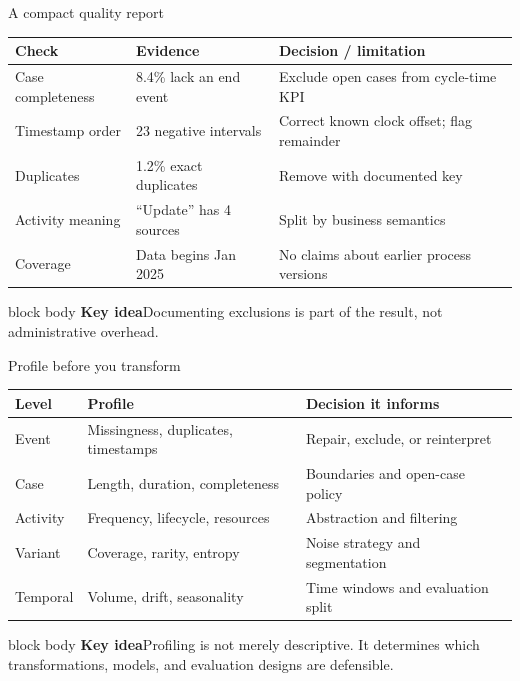 \documentclass[aspectratio=169,11pt]{beamer}
\newcommand{\keyidea}[1]{%
  \begin{beamercolorbox}[rounded=true,sep=0.65em]{block body}
    \textbf{\color{Teal}Key idea}\quad #1
  \end{beamercolorbox}
}
\begin{document}
\begin{frame}{A compact quality report}
  \small
  \begin{tabular}{@{}p{}p{}p{}@{}}
    \toprule
    Check & Evidence & Decision / limitation\\
    \midrule
    Case completeness & 8.4\% lack an end event & Exclude open cases from cycle-time KPI\\
    Timestamp order & 23 negative intervals & Correct known clock offset; flag remainder\\
    Duplicates & 1.2\% exact duplicates & Remove with documented key\\
    Activity meaning & ``Update'' has 4 sources & Split by business semantics\\
    Coverage & Data begins Jan 2025 & No claims about earlier process versions\\
    \bottomrule
  \end{tabular}
  \vspace{0.45cm}
  \keyidea{Documenting exclusions is part of the result, not administrative
  overhead.}
\end{frame}

\begin{frame}{Profile before you transform}
  \small
  \begin{tabular}{@{}p{}p{}p{}@{}}
    \toprule
    Level & Profile & Decision it informs\\
    \midrule
    Event & Missingness, duplicates, timestamps & Repair, exclude, or reinterpret\\
    Case & Length, duration, completeness & Boundaries and open-case policy\\
    Activity & Frequency, lifecycle, resources & Abstraction and filtering\\
    Variant & Coverage, rarity, entropy & Noise strategy and segmentation\\
    Temporal & Volume, drift, seasonality & Time windows and evaluation split\\
    \bottomrule
  \end{tabular}
  \vspace{0.45cm}
  \keyidea{Profiling is not merely descriptive. It determines which
  transformations, models, and evaluation designs are defensible.}
\end{frame}
\end{document}

